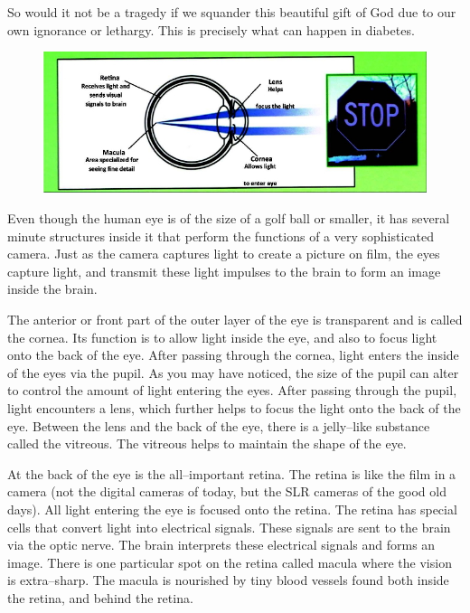 {So would it not be a tragedy if we squander this beautiful gift of God due to our own ignorance or lethargy. This is precisely what can happen in diabetes.


\begin{figure}
\includegraphics{images/049.jpg}
\end{figure}

Even though the human eye is of the size of a golf ball or smaller, it has several minute structures inside it that perform the functions of a very sophisticated camera. Just as the camera captures light to create a picture on film, the eyes capture light, and transmit these light impulses to the brain to form an image inside the brain.

The anterior or front part of the outer layer of the eye is transparent and is called the cornea. Its function is to allow light inside the eye, and also to focus light onto the back of the eye. After passing through the cornea, light enters the inside of the eyes via the pupil. As you may have noticed, the size of the pupil can alter to control the amount of light entering the eyes. After passing through the pupil, light encounters a lens, which further helps to focus the light onto the back of the eye. Between the lens and the back of the eye, there is a jelly–like substance called the vitreous. The vitreous helps to maintain the shape of the eye.

At the back of the eye is the all–important retina. The retina is like the film in a camera (not the digital cameras of today, but the SLR cameras of the good old days). All light entering the eye is focused onto the retina. The retina has special cells that convert light into electrical signals. These signals are sent to the brain via the optic nerve. The brain interprets these electrical signals and forms an image. There is one particular spot on the retina called macula where the vision is extra–sharp. The macula is nourished by tiny blood vessels found both inside the retina, and behind the retina.

}
